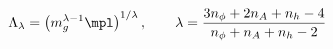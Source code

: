 \begin{equation}
\Lambda_{\lambda} = \left(m_g^{\lambda-1} \mpl \right)^{1/\lambda}, 
\quad\quad
\lambda = \frac{3 n_{\phi} + 2 n_A + n_h - 4}
{n_{\phi} + n_A + n_h - 2} 
\label{lamform}
\end{equation}

